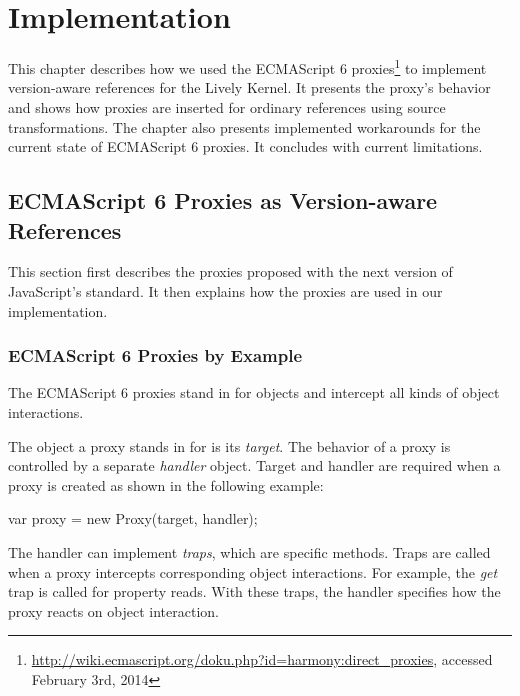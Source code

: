 

\chapter{Implementation} \label{chapter:IMPLEMENTATION}

This chapter describes how we used the ECMAScript 6 proxies\footnote{\url{http://wiki.ecmascript.org/doku.php?id=harmony:direct_proxies}, accessed February 3rd, 2014} to implement version-aware references for the Lively Kernel.
It presents the proxy's behavior and shows how proxies are inserted for ordinary references using source transformations.
The chapter also presents implemented workarounds for the current state of ECMAScript 6 proxies.
It concludes with current limitations.

\section{ECMAScript 6 Proxies as Version-aware References} \label{sec:IMPLEMENTATION:1}

This section first describes the proxies proposed with the next version of JavaScript's standard.
It then explains how the proxies are used in our implementation.

\subsection{ECMAScript 6 Proxies by Example} \label{subsec:IMPLEMENTATION:1.1}

The ECMAScript 6 proxies stand in for objects and intercept all kinds of object interactions.

The object a proxy stands in for is its \emph{target}.
The behavior of a proxy is controlled by a separate \emph{handler} object.
Target and handler are required when a proxy is created as shown in the following example:

\begin{code}{}{}
var proxy = new Proxy(target, handler);
\end{code}
\iffalse
\end{verbatim}\fi

The handler can implement \emph{traps}, which are specific methods.
Traps are called when a proxy intercepts corresponding object interactions.
For example, the \emph{get} trap is called for property reads.
With these traps, the handler specifies how the proxy reacts on object interaction.

